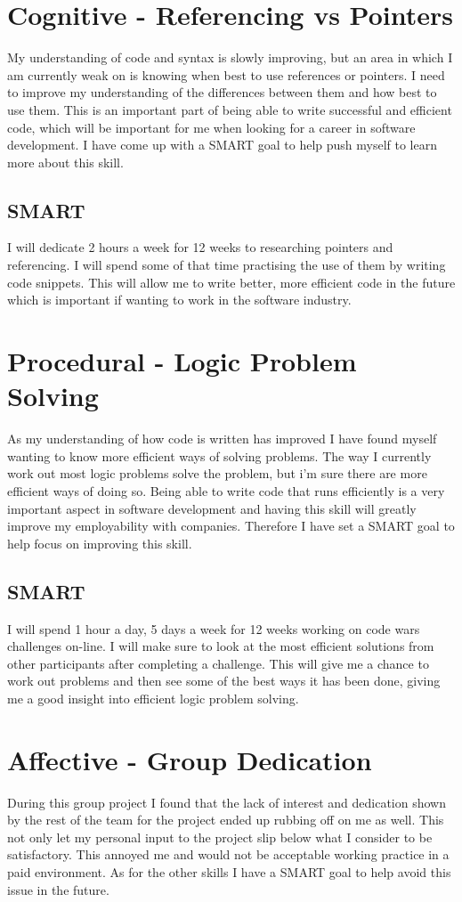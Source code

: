 \documentclass{scrartcl}
\begin{document}
\section{Cognitive - Referencing vs Pointers}
My understanding of code and syntax is slowly improving, but an area in which I am currently weak on is knowing when best to use references or pointers. I need to improve my understanding of the differences between them and how best to use them. This is an important part of being able to write successful and efficient code, which will be important for me when looking for a career in software development. I have come up with a SMART goal to help push myself to learn more about this skill.
\subsection{SMART}
I will dedicate 2 hours a week for 12 weeks to researching pointers and referencing. I will spend some of that time practising the use of them by writing code snippets. This will allow me to write better, more efficient code in the future which is important if wanting to work in the software industry.


\section{Procedural - Logic Problem Solving}
As my understanding of how code is written has improved I have found myself wanting to know more efficient ways of solving problems. The way I currently work out most logic problems solve the problem, but i'm sure there are more efficient ways of doing so. Being able to write code that runs efficiently is a very important aspect in software development and having this skill will greatly improve my employability with companies. Therefore I have set a SMART goal to help focus on improving this skill.

\subsection{SMART}
I will spend 1 hour a day, 5 days a week for 12 weeks working on code wars challenges on-line. I will make sure to look at the most efficient solutions from other participants after completing a challenge. This will give me a chance to work out problems and then see some of the best ways it has been done, giving me a good insight into efficient logic problem solving.


\section{Affective - Group Dedication}
During this group project I found that the lack of interest and dedication shown by the rest of the team for the project ended up rubbing off on me as well. This not only let my personal input to the project slip below what I consider to be satisfactory. This annoyed me and would not be acceptable working practice in a paid environment. As for the other skills I have a SMART goal to help avoid this issue in the future.
\end{document}

